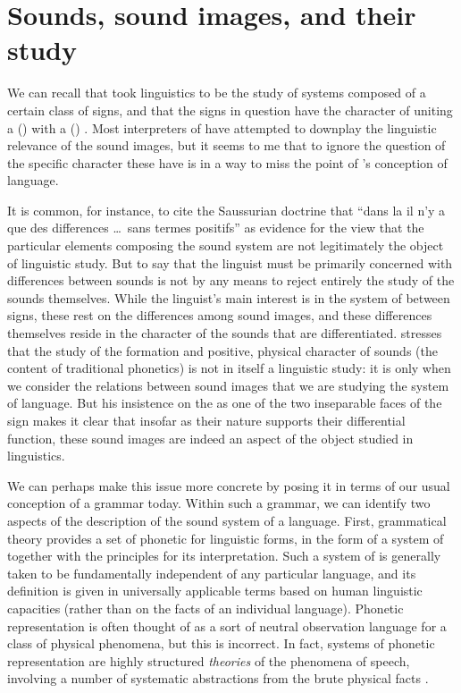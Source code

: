 \section{Sounds, sound images, and their study}
\largerpage
We can recall that {\Saussure} took linguistics to be the study of
systems composed of a certain class of signs, and that the signs in
question have the character of uniting a ()  with a
() . Most interpreters of {\Saussure} have attempted
to downplay the linguistic relevance of the sound images, but it seems
to me that to ignore the question of the specific character these have
is in a way to miss the point of {\Saussure}'s conception of language.

It is common, for instance, to cite the Saussurian doctrine that
``dans la \emph{} il n'y a que des differences \ldots\ sans termes
positifs'' as evidence for the view that the particular elements
composing the sound system are not legitimately the object of
linguistic study. But to say that the linguist must be primarily
concerned with differences between sounds is not by any means to
reject entirely the study of the sounds themselves. While the
linguist's main interest is in the system of  between
signs, these  rest on the differences among sound images,
and these differences themselves reside in the character of the sounds
that are differentiated. {\Saussure} stresses that the study of the
formation and positive, physical character of sounds (the content of
traditional phonetics) is not in itself a linguistic study: it is only
when we consider the relations between sound images that we are
studying the system of language. But his insistence on the 
as one of the two inseparable faces of the sign makes it clear that
insofar as their nature supports their differential function, these
sound images are indeed an aspect of the object studied in
linguistics.

We can perhaps make this issue more concrete by posing it in terms of
our usual conception of a grammar today. Within such a grammar, we can
identify two aspects of the description of the sound system of a
language. First, grammatical theory provides a set of phonetic
 for linguistic forms, in the form of a system of
 together with the principles for its
interpretation. Such a system of  is generally taken to
be fundamentally independent of any particular language, and its
definition is given in universally applicable terms based on human
linguistic capacities (rather than on the facts of an individual
language). Phonetic representation is often thought of as a sort of
neutral observation language for a class of physical phenomena, but
this is incorrect. In fact, systems of phonetic representation are
highly structured \emph{theories} of the phenomena of speech,
involving a number of systematic abstractions from the brute physical
facts \citep[68ff.]{sra:dwl:organ_book}.

